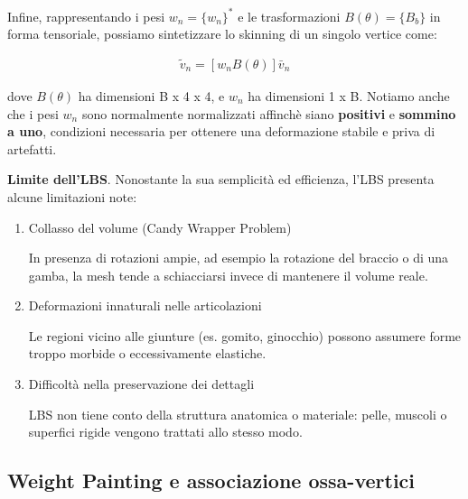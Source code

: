 \begin{itemize}
Infine, rappresentando i pesi $w_n = \{w_n\}^*$ e le trasformazioni \(B(\theta) = \{B_b\}\) in forma tensoriale, possiamo sintetizzare lo skinning di un singolo vertice come:

\begin{align*}
    \tilde{v}_n = [w_nB(\theta)]\bar{v}_n
\end{align*}

dove \(B(\theta)\) ha dimensioni B x 4 x 4, e \(w_n\) ha dimensioni 1 x B.
Notiamo anche che i pesi \(w_n\) sono normalmente normalizzati affinchè siano \textbf{positivi} e \textbf{sommino a uno}, condizioni necessaria per ottenere una deformazione stabile e priva di artefatti.~\cite{lbs}

\textbf{Limite dell'LBS}. Nonostante la sua semplicità ed efficienza, l'LBS presenta alcune limitazioni note:
\begin{enumerate}
    \item Collasso del volume (Candy Wrapper Problem)
    
    In presenza di rotazioni ampie, ad esempio la rotazione del braccio o di una gamba, la mesh tende a schiacciarsi invece di mantenere il volume reale.
    \item Deformazioni innaturali nelle articolazioni
    
    Le regioni vicino alle giunture (es. gomito, ginocchio) possono assumere forme troppo morbide o eccessivamente elastiche.
    \item Difficoltà nella preservazione dei dettagli
    
    LBS non tiene conto della struttura anatomica o materiale: pelle, muscoli o superfici rigide vengono trattati allo stesso modo.
\end{enumerate}

\subsection{Weight Painting e associazione ossa-vertici}


\end{itemize}
